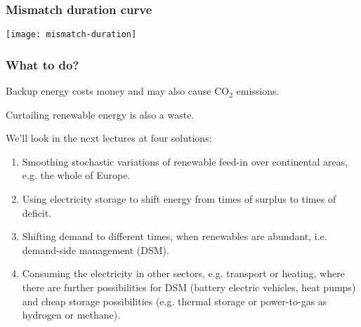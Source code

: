 \documentclass[10pt,aspectratio=169,dvipsnames]{beamer}
\let\olditem\item
\renewcommand{\item}{%
\olditem\vspace{5pt}}
\begin{document}
\begin{frame}
  \frametitle{Mismatch duration curve}


  \centering
  \texttt{[image: mismatch-duration]}


\end{frame}



\begin{frame}
  \frametitle{What to do?}

  Backup energy costs money and may also cause CO${}_2$ emissions.

  Curtailing renewable energy is also a waste.

  We'll look in the next lectures at \alert{four solutions}:
  \begin{enumerate}
  \item \alert{Smoothing} stochastic variations of renewable feed-in \alert{over continental areas}, e.g. the whole of Europe.
  \item Using \alert{electricity storage} to shift energy from times of surplus to times of deficit.
  \item Shifting demand to different times, when renewables are abundant, i.e. \alert{demand-side management} (DSM).
    \item Consuming the electricity in \alert{other sectors}, e.g. transport or heating, where there are further possibilities for DSM (battery electric vehicles, heat pumps)  and cheap storage possibilities (e.g. thermal storage or power-to-gas as hydrogen or methane).
  \end{enumerate}



\end{frame}
\end{document}
